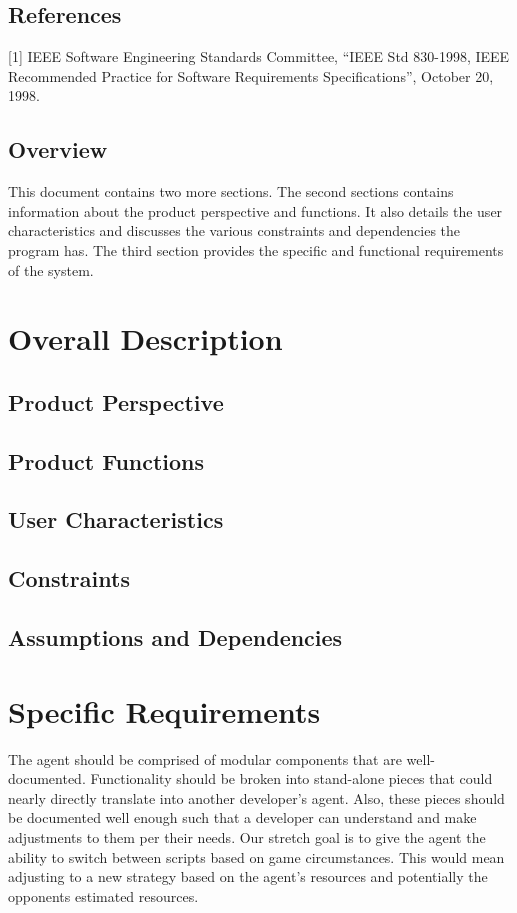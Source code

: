 \documentclass[10pt,letterpaper,onecolumn,draftclsnofoot]{IEEEtran}
\begin{document}
\subsection{References}
[1] IEEE Software Engineering Standards Committee, “IEEE Std 830-1998, IEEE Recommended Practice for Software Requirements Specifications”, October 20, 1998.

\subsection{Overview}
This document contains two more sections. The second sections contains information about the product perspective and functions. It also details the user characteristics and discusses the various constraints and dependencies the program has. The third section provides the specific and functional requirements of the system.

\newpage

\section{Overall Description}

\subsection{Product Perspective}

\subsection{Product Functions}

\subsection{User Characteristics}

\subsection{Constraints}

\subsection{Assumptions and Dependencies}

\newpage

\section{Specific Requirements}
The agent should be comprised of modular components that are well-documented. Functionality should be broken into stand-alone pieces that could nearly directly translate into another developer's agent. Also, these pieces should be documented well enough such that a developer can understand and make adjustments to them per their needs. Our stretch goal is to give the agent the ability to switch between scripts based on game circumstances. This would mean adjusting to a new strategy based on the agent's resources and potentially the opponents estimated resources.
\end{document}
